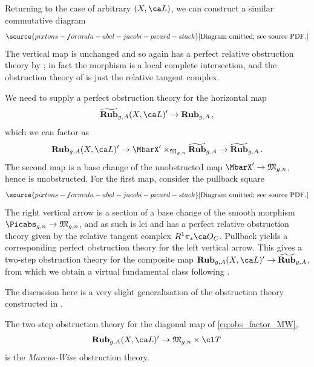 
Returning to the case of arbitrary $(X,\ca L)$,
we can construct a similar commutative diagram
\begin{equation}\label{eq:obs_factor_MW}
\source{pixtons-formula-abel-jacobi-picard-stack}
 \text{[Diagram omitted; see source PDF.]}
\end{equation}
The vertical map is unchanged and so again has a perfect relative obstruction theory by \cite[Proposition ]{Marcus2017Logarithmic-com}; in fact the morphism is a local complete intersection, and the obstruction theory of \cite[Proposition ]{Marcus2017Logarithmic-com} is just the relative tangent complex.

We need to supply a perfect obstruction theory for the horizontal map $$\widetilde{\cat{Rub}}_{g,A}(X, \ca L)'  \to  \cat{Rub}_{g,A}\, ,$$
which we can factor as
\begin{equation}
\cat{Rub}_{g,A}(X, \ca L)'  \to \MbarX' \times_{\frak M_{g,n}}\widetilde{\cat{Rub}}_{g,A}  \to \widetilde{\cat{Rub}}_{g,A}\, .
\end{equation}
The second map is a base change of the unobstructed map $\MbarX' \to \frak M_{g,n}$, hence is unobstructed. For the first map, consider the pullback square
\begin{equation}\label{eq:long_vertical_pullback}
\source{pixtons-formula-abel-jacobi-picard-stack}
 \text{[Diagram omitted; see source PDF.]}
\end{equation}
The right vertical arrow is a section of a base change of the smooth morphism $\Picabs_{g,n} \to \frak M_{g,n}$, and as such is lci and has a perfect relative obstruction theory given by the relative tangent complex $R^1\pi_*\ca O_C$. Pullback yields a corresponding perfect obstruction theory for the left vertical arrow. This gives a two-step obstruction theory for the composite map $\cat{Rub}_{g,A}(X, \ca L)'  \to  \widetilde{\cat{Rub}}_{g,A}$, from which we obtain a virtual fundamental class following \cite{Manolache2012Pullbacks}.

The discussion here
is a very slight generalisation of the obstruction theory constructed in \cite[]{Marcus2017Logarithmic-com}.


\begin{definition}
\notready
The two-step obstruction theory for the diagonal map of \eqref{eq:obs_factor_MW},
$$
\cat{Rub}_{g,A}(X, \ca L)' \to \frak M_{g,n} \times \cl T\, $$ is the \emph{Marcus-Wise} obstruction theory.
\end{definition}


